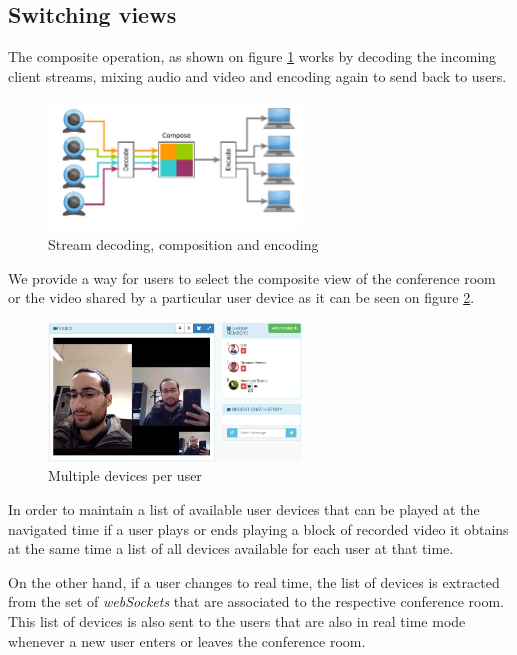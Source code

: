 	\subsection{Switching views}

		The composite operation, as shown on figure \ref{fig:wcomposite} works by decoding the incoming client streams, mixing audio and video and encoding again to send back to users.

	\begin{figure}[!htb]
		\centering
		\includegraphics[width=0.6\textwidth]{figures/wcomposite.pdf}
		\caption{Stream decoding, composition and encoding}
		\label{fig:wcomposite}
	\end{figure}


		We provide a way for users to select the composite view of the conference room or the video shared by a particular user device as it can be seen on figure \ref{fig:devices}. 
	
	\begin{figure}[!htb]
		\centering
		\includegraphics[width=0.6\textwidth]{figures/devices.png}
		\caption{Multiple devices per user}
		\label{fig:devices}
	\end{figure}


		In order to maintain a list of available user devices that can be played at the navigated time if a user plays or ends playing a block of recorded video it obtains at the same time a list of all devices available for each user at that time.

		On the other hand, if a user changes to real time, the list of devices is extracted from the set of \emph{webSockets} that are associated to the respective conference room. This list of devices is also sent to the users that are also in real time mode whenever a new user enters or leaves the conference room.

